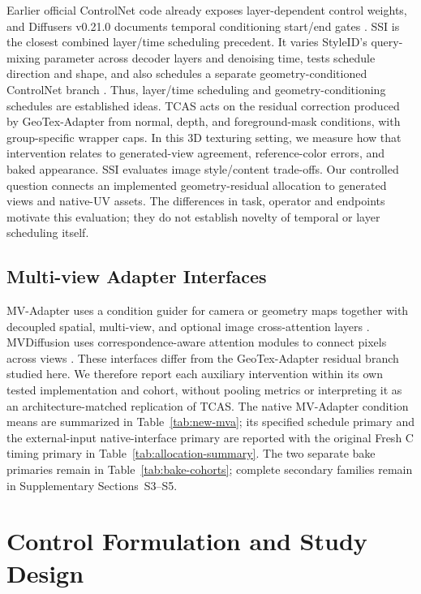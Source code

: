 \documentclass[times,twocolumn,final]{elsarticle}
\begin{document}
Earlier official ControlNet code already exposes layer-dependent control weights, and Diffusers v0.21.0 documents temporal conditioning start/end gates \cite{controlnet2023layercontrol,diffusers2023controlnet}. SSI is the closest combined layer/time scheduling precedent. It varies StyleID's query-mixing parameter \cite{chung2024styleid} across decoder layers and denoising time, tests schedule direction and shape, and also schedules a separate geometry-conditioned ControlNet branch \cite{kulkarni2026ssi}. Thus, layer/time scheduling and geometry-conditioning schedules are established ideas. TCAS acts on the residual correction produced by GeoTex-Adapter from normal, depth, and foreground-mask conditions, with group-specific wrapper caps. In this 3D texturing setting, we measure how that intervention relates to generated-view agreement, reference-color errors, and baked appearance. SSI evaluates image style/content trade-offs. Our controlled question connects an implemented geometry-residual allocation to generated views and native-UV assets. The differences in task, operator and endpoints motivate this evaluation; they do not establish novelty of temporal or layer scheduling itself.

\subsection{Multi-view Adapter Interfaces}
\label{subsec:mvinterfaces}

MV-Adapter uses a condition guider for camera or geometry maps together with decoupled spatial, multi-view, and optional image cross-attention layers \cite{huang2024mvadapter}. MVDiffusion uses correspondence-aware attention modules to connect pixels across views \cite{tang2023mvdiffusion}. These interfaces differ from the GeoTex-Adapter residual branch studied here. We therefore report each auxiliary intervention within its own tested implementation and cohort, without pooling metrics or interpreting it as an architecture-matched replication of TCAS. The native MV-Adapter condition means are summarized in Table~\ref{tab:new-mva}; its specified schedule primary and the external-input native-interface primary are reported with the original Fresh C timing primary in Table~\ref{tab:allocation-summary}. The two separate bake primaries remain in Table~\ref{tab:bake-cohorts}; complete secondary families remain in Supplementary Sections~S3--S5.

\section{Control Formulation and Study Design}
\label{sec:method}
\end{document}
